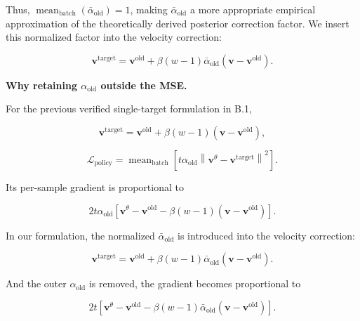 \documentclass{article} %
\begin{document}
Thus,
$\operatorname{mean}_{\mathrm{batch}}(\bar{\alpha}_{\mathrm{old}})=1$,
making $\bar{\alpha}_{\mathrm{old}}$ a more appropriate empirical approximation of the theoretically derived posterior correction factor. We insert this normalized factor into the velocity correction:

\begin{equation}
\mathbf{v}^{\mathrm{target}}
=\mathbf{v}^{\mathrm{old}}
+
\beta (w-1)
\bar{\alpha}_{\mathrm{old}}
\left(
\mathbf{v}-\mathbf{v}^{\mathrm{old}}
\right).
\end{equation}

\noindent\textbf{Why retaining $\alpha_{\mathrm{old}}$ outside the MSE.}

For the previous verified single-target formulation in B.1,

\begin{equation}
\mathbf v^{\mathrm{target}}
=
\mathbf v^{\mathrm{old}}
+
\beta(w-1)
\left(
\mathbf v-\mathbf v^{\mathrm{old}}
\right),
\end{equation}

\begin{equation}
\mathcal L_{\mathrm{policy}}
=
\operatorname{mean}_{\mathrm{batch}}
\left[
t\alpha_{\mathrm{old}}
\left\|
\mathbf v^\theta-\mathbf v^{\mathrm{target}}
\right\|^2
\right].
\end{equation}

Its per-sample gradient is proportional to

\begin{equation}
2t\alpha_{\mathrm{old}}
\left[
\mathbf v^\theta-\mathbf v^{\mathrm{old}}
-
\beta(w-1)
\left(
\mathbf v-\mathbf v^{\mathrm{old}}
\right)
\right].
\end{equation}

In our formulation, the normalized $\bar{\alpha}_{\mathrm{old}}$ is introduced into the velocity correction:

\begin{equation}
\mathbf v^{\mathrm{target}}
=
\mathbf v^{\mathrm{old}}
+
\beta(w-1)
\bar{\alpha}_{\mathrm{old}}
\left(
\mathbf v-\mathbf v^{\mathrm{old}}
\right).
\end{equation}

And the outer $\alpha_{\mathrm{old}}$ is removed, the gradient becomes proportional to

\begin{equation}
2t
\left[
\mathbf v^\theta-\mathbf v^{\mathrm{old}}
-
\beta(w-1)
\bar{\alpha}_{\mathrm{old}}
\left(
\mathbf v-\mathbf v^{\mathrm{old}}
\right)
\right].
\end{equation}
\end{document}
